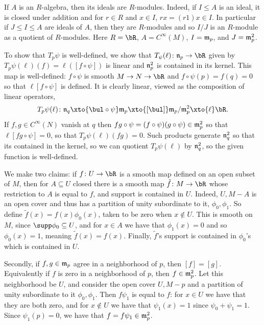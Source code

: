     \item If $A$ is an $R$-algebra, then its ideals are $R$-modules.
    Indeed, if $I\leq A$ is an ideal, it is closed under addition and for $r\in R$ and $x\in I$, $rx=(r1)x\in I$.
    In particular if $J\leq I\leq A$ are ideals of $A$, then they are $R$-modules and so $I/J$ is an $R$-module as a
    quotient of $R$-modules.
    Here $R=\bR$, $A=C^\infty(M)$, $I={\frak m}_p$, and $J={\frak m}_p^2$.

    \item To show that $T_p\psi$ is well-defined, we show that $T_\psi(\ell)\colon\n_p\to\bR$ given by
    $T_p\psi(\ell)(f)=\ell([f\circ\psi])$ is linear and ${\frak n}_p^2$ is contained in its kernel.
    This map is well-defined: $f\circ\psi$ is smooth $M\to N\to\bR$ and $f\circ\psi(p)=f(q)=0$ so that
    $\ell[f\circ\psi]$ is defined.
    It is clearly linear, viewed as the composition of linear operators,
    $$ T_p\psi(\ell)\colon \n_q\xto{\bul\circ\psi}\m_p\xto{[\bul]}\m_p/\m_p^2\xto{\ell}\bR . $$
    If $f,g\in C^\infty(N)$ vanish at $q$ then $fg\circ\psi=(f\circ\psi)(g\circ\psi)\in{\frak m}_p^2$ so that
    $\ell[fg\circ\psi]=0$, so that $T_p\psi(\ell)(fg)=0$.
    Such products generate ${\frak n}_q^2$ so that its contained in the kernel, so we can quotient $T_p\psi(\ell)$ by
    ${\frak n}_q^2$, so the given function is well-defined.

    \item We make two claims: if $f\colon U\to\bR$ is a smooth map defined on an open subset of $M$, then for
    $A\subseteq U$ closed there is a smooth map $\tilde f\colon M\to\bR$ whose restriction to $A$ is equal to $f$, 
    and support is contained in $U$.
    Indeed, $U,M-A$ is an open cover and thus has a partition of unity subordinate to it, $\phi_0,\phi_1$.
    So define $\tilde f(x)=f(x)\phi_0(x)$, taken to be zero when $x\notin U$.
    This is smooth on $M$, since $\supp\phi_0\subseteq U$, and for $x\in A$ we have that $\phi_1(x)=0$ and so $\phi_0(x)=1$,
    meaning $\tilde f(x)=f(x)$.
    Finally, $\tilde f$'s support is contained in $\phi_0$'s which is contained in $U$.

    Secondly, if $f,g\in{\frak m}_p$ agree in a neighborhood of $p$, then $[f]=[g]$.
    Equivalently if $f$ is zero in a neighborhood of $p$, then $f\in{\frak m}_p^2$.
    Let this neighborhood be $U$, and consider the open cover $U,M-p$ and a partition of unity subordinate to it
    $\phi_0,\phi_1$.
    Then $f\psi_1$ is equal to $f$: for $x\in U$ we have that they are both zero, and for $x\notin U$ we have that
    $\psi_1(x)=1$ since $\psi_0+\psi_1=1$.
    Since $\psi_1(p)=0$, we have that $f=f\psi_1\in{\frak m}_p^2$.

